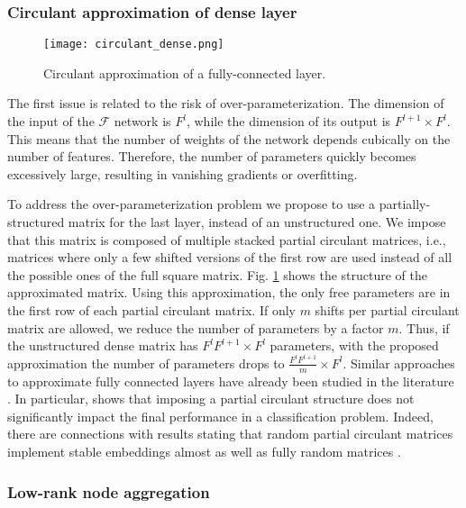 \documentclass[journal]{IEEEtran}
\newcommand{\fun}{\mathcal{F}}
\begin{document}
\subsubsection{Circulant approximation of dense layer}

\begin{figure}
    \centering
    \texttt{[image: circulant\_dense.png]}
    \caption{Circulant approximation of a fully-connected layer.}
    \label{fig:circ}
\end{figure}

The first issue is related to the risk of over-parameterization. The dimension of the input of the $\fun$ network is $F^l$, while the dimension of its output is $F^{l+1}\times F^{l}$. This means that the number of weights of the network depends cubically on the number of features. Therefore, the number of parameters quickly becomes excessively large, resulting in vanishing gradients or overfitting. 



To address the over-parameterization problem we propose to use a partially-structured matrix for the last layer, instead of an unstructured one. We impose that this matrix is composed of multiple stacked partial circulant matrices, i.e., matrices where only a few shifted versions of the first row are used instead of all the possible ones of the full square matrix. Fig. \ref{fig:circ} shows the structure of the approximated matrix. Using this approximation, the only free parameters are in the first row of each partial circulant matrix. If only $m$ shifts per partial circulant matrix are allowed, we reduce the number of parameters by a factor $m$. Thus, if the unstructured dense matrix has $F^l F^{l+1} \times F^l$ parameters, with the proposed approximation the number of parameters drops to  $\frac{F^l F^{l+1}}{m}\times F^l$. Similar approaches to approximate fully connected layers have already been studied in the literature \cite{cheng2015exploration,wu2016compression}. In particular, \cite{cheng2015exploration} shows that imposing a partial circulant structure does not significantly impact the final performance in a classification problem. Indeed, there are connections with results stating that random partial circulant matrices implement stable embeddings almost as well as fully random matrices \cite{hinrichs2011johnson,valsesia2017user,valsesia2017binary}.


\subsubsection{Low-rank node aggregation}
\end{document}

